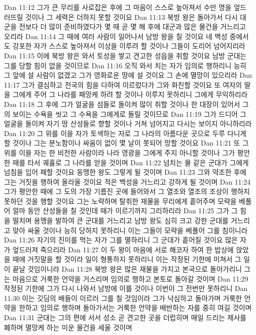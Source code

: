 Dan 11:12  그가 큰 무리를 사로잡은 후에 그 마음이 스스로 높아져서 수만 명을 엎드러뜨릴 것이나 그 세력은 더하지 못할 것이요
Dan 11:13  북방 왕은 돌아가서 다시 대군을 전보다 더 많이 준비하였다가 몇 때 곧 몇 해 후에 대군과 많은 물건을 거느리고 오리라
Dan 11:14  그 때에 여러 사람이 일어나서 남방 왕을 칠 것이요 네 백성 중에서도 강포한 자가 스스로 높아져서 이상을 이루려 할 것이나 그들이 도리어 넘어지리라
Dan 11:15  이에 북방 왕은 와서 토성을 쌓고 견고한 성읍을 취할 것이요 남방 군대는 그를 당할 힘이 없을 것이므로
Dan 11:16  오직 와서 치는 자가 임의로 행하리니 능히 그 앞에 설 사람이 없겠고 그가 영화로운 땅에 설 것이요 그 손에 멸망이 있으리라
Dan 11:17  그가 결심하고 전국의 힘을 다하여 이르렀다가 그와 화친할 것이요 또 여자의 딸을 그에게 주어 그 나라를 패망케 하려 할 것이나 이루지 못하리니 그에게 무익하리라
Dan 11:18  그 후에 그가 얼굴을 섬들로 돌이켜 많이 취할 것이나 한 대장이 있어서 그의 보이는 수욕을 씻고 그 수욕을 그에게로 돌릴 것이므로
Dan 11:19  그가 드디어 그 얼굴을 돌이켜 자기 땅 산성들로 향할 것이나 거쳐 넘어지고 다시는 보이지 아니하리라
Dan 11:20  그 위를 이을 자가 토색하는 자로 그 나라의 아름다운 곳으로 두루 다니게 할 것이나 그는 분노함이나 싸움이 없이 몇 날이 못되어 망할 것이요
Dan 11:21  또 그 위를 이을 자는 한 비천한 사람이라 나라 영광을 그에게 주지 아니할 것이나 그가 평안한 때를 타서 궤휼로 그 나라를 얻을 것이며
Dan 11:22  넘치는 물 같은 군대가 그에게 넘침을 입어 패할 것이요 동맹한 왕도 그렇게 될 것이며
Dan 11:23  그와 약조한 후에 그는 거짓을 행하여 올라올 것이요 적은 백성을 거느리고 강하게 될 것이며
Dan 11:24  그가 평안한 때에 그 도의 가장 기름진 곳에 들어와서 그 열조와 열조의 조상이 행하지 못하던 것을 행할 것이요 그는 노략하며 탈취한 재물을 무리에게 흩어주며 모략을 베풀어 얼마 동안 산성들을 칠 것인데 때가 이르기까지 그리하리라
Dan 11:25  그가 그 힘을 떨치며 용맹을 발하여 큰 군대를 거느리고 남방 왕도 심히 크고 강한 군대를 거느리고 맞아 싸울 것이나 능히 당하지 못하리니 이는 그들이 모략을 베풀어 그를 침이니라
Dan 11:26  자기의 진미를 먹는 자가 그를 멸하리니 그 군대가 흩어질 것이요 많은 자가 엎드러져 죽으리라
Dan 11:27  이 두 왕이 마음에 서로 해코자 하여 한 밥상에 앉았을 때에 거짓말을 할 것이라 일이 형통하지 못하리니 이는 작정된 기한에 미쳐서 그 일이 끝날 것임이니라
Dan 11:28  북방 왕은 많은 재물을 가지고 본국으로 돌아가리니 그는 마음으로 거룩한 언약을 거스리며 임의로 행하고 본토로 돌아갈 것이며
Dan 11:29  작정된 기한에 그가 다시 나와서 남방에 이를 것이나 이번이 그 전번만 못하리니
Dan 11:30  이는 깃딤의 배들이 이르러 그를 칠 것임이라 그가 낙심하고 돌아가며 거룩한 언약을 한하고 임의로 행하며 돌아가서는 거룩한 언약을 배반하는 자를 중히 여길 것이며
Dan 11:31  군대는 그의 편에 서서 성소 곧 견고한 곳을 더럽히며 매일 드리는 제사를 폐하며 멸망케 하는 미운 물건을 세울 것이며
